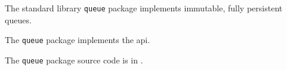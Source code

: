 
The standard library {\tt queue} package implements immutable, fully persistent queues.

The {\tt queue} package implements the  api.

The {\tt queue} package source code is in .



